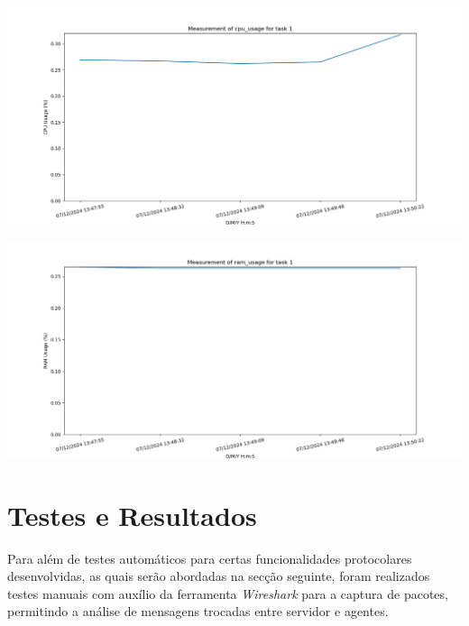 \documentclass[a4paper,12pt]{scrreprt}
\begin{document}
\begin{minipage}{.5\textwidth}
    \centering
    \includegraphics[width=\textwidth]{img/analysis/cpu_usage.png}
    \label{fig:cpu_usage}
\end{minipage}
\hfill
\begin{minipage}{.5\textwidth}
    \centering
    \includegraphics[width=\textwidth]{img/analysis/ram_usage.png}
    \label{fig:ram_usage}
\end{minipage}




\chapter{Testes e Resultados}

Para além de testes automáticos para certas funcionalidades protocolares desenvolvidas,
as quais serão abordadas na secção seguinte, foram realizados testes manuais com auxílio
da ferramenta \textit{Wireshark} para a captura de pacotes, permitindo a análise
de mensagens trocadas entre servidor e agentes.
\end{document}
